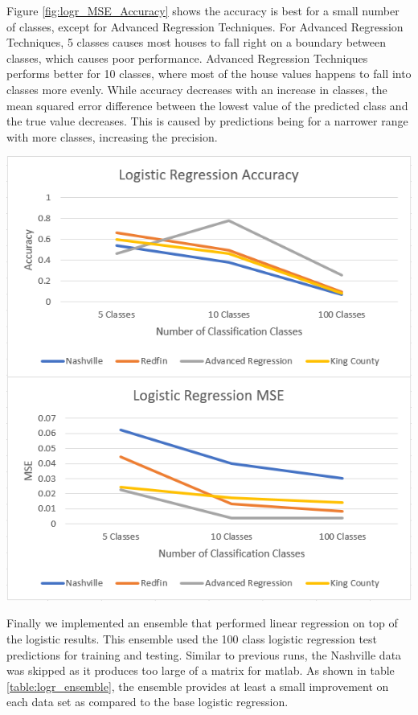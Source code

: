 \documentclass[10pt]{article}
\begin{document}
\begin{multicols}{2}
			\label{table:logr_performance}        
			\setlength{\parindent}{15pt}
		\par
			Figure \ref{fig:logr_MSE_Accuracy} shows the accuracy is best for a small number of classes, except for Advanced Regression Techniques. For Advanced Regression Techniques, 5 classes causes most houses to fall right on a boundary between classes, which causes poor performance. Advanced Regression Techniques performs better for 10 classes, where most of the house values happens to fall into classes more evenly. While accuracy decreases with an increase in classes, the mean squared error difference between the lowest value of the predicted class and the true value decreases. This is caused by predictions being for a narrower range with more classes, increasing the precision.
		\par
		\begin{center}
	            \captionsetup{type=figure}
			\includegraphics[scale=0.6]{Images/LogisticRegressionMSEAccuracy} \\
			\label{fig:logr_MSE_Accuracy}
		\end{center}
		\par
			Finally we implemented an ensemble that performed linear regression on top of the logistic results. This ensemble used the 100 class logistic regression test predictions for training and testing. Similar to previous runs, the Nashville data was skipped as it produces too large of a matrix for matlab. As shown in table \ref{table:logr_ensemble}, the ensemble provides at least a small improvement on each data set as compared to the base logistic regression.

\end{multicols}
\end{document}
